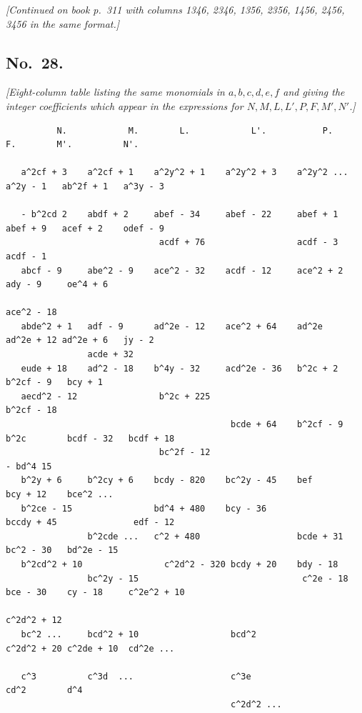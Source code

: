 \documentclass[11pt]{article}
\begin{document}
\textit{[Continued on book p.~311 with columns 1346, 2346, 1356, 2356, 1456, 2456, 3456 in the same format.]}

\bigskip

\subsection*{No.\ 28.}

\textit{[Eight-column table listing the same monomials in $a,b,c,d,e,f$ and giving the integer coefficients which appear in the expressions for $N, M, L, L', P, F, M', N'$.]}

\smallskip

\begin{small}
\begin{verbatim}
          N.            M.        L.            L'.           P.        F.        M'.          N'.

   a^2cf + 3    a^2cf + 1    a^2y^2 + 1    a^2y^2 + 3    a^2y^2 ...    a^2y - 1   ab^2f + 1   a^3y - 3

   - b^2cd 2    abdf + 2     abef - 34     abef - 22     abef + 1      abef + 9   acef + 2    odef - 9
                              acdf + 76                  acdf - 3      acdf - 1
   abcf - 9     abe^2 - 9    ace^2 - 32    acdf - 12     ace^2 + 2                ady - 9     oe^4 + 6
                                                                       ace^2 - 18
   abde^2 + 1   adf - 9      ad^2e - 12    ace^2 + 64    ad^2e         ad^2e + 12 ad^2e + 6   jy - 2
                acde + 32
   eude + 18    ad^2 - 18    b^4y - 32     acd^2e - 36   b^2c + 2                 b^2cf - 9   bcy + 1
   aecd^2 - 12                b^2c + 225                              b^2cf - 18
                                            bcde + 64    b^2cf - 9    b^2c        bcdf - 32   bcdf + 18
                              bc^2f - 12                                                      - bd^4 15
   b^2y + 6     b^2cy + 6    bcdy - 820    bc^2y - 45    bef          bcy + 12    bce^2 ...
   b^2ce - 15                bd^4 + 480    bcy - 36                   bccdy + 45               edf - 12
                b^2cde ...   c^2 + 480                   bcde + 31    bc^2 - 30   bd^2e - 15
   b^2cd^2 + 10                c^2d^2 - 320 bcdy + 20    bdy - 18
                bc^2y - 15                                c^2e - 18   bce - 30    cy - 18     c^2e^2 + 10
                                                                      c^2d^2 + 12
   bc^2 ...     bcd^2 + 10                  bcd^2                     c^2d^2 + 20 c^2de + 10  cd^2e ...

   c^3          c^3d  ...                   c^3e                                  cd^2        d^4
                                            c^2d^2 ...
\end{verbatim}
\end{small}
\end{document}
